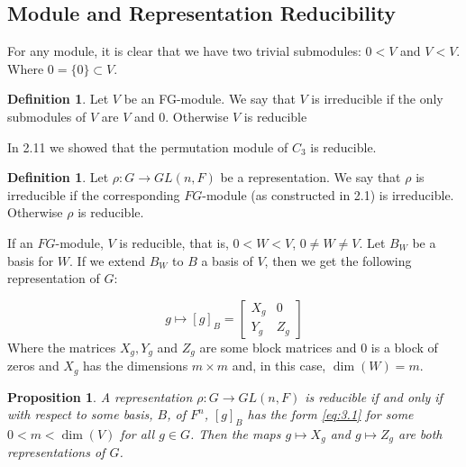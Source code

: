 \documentclass[11pt, notitlepage]{article}
\numberwithin{equation}{section}
\theoremstyle{plain}
\newtheorem{proposition}[theorem]{Proposition}
\theoremstyle{definition}
\newtheorem{definition}[theorem]{Definition}
\begin{document}
\subsection{Module and Representation Reducibility}

For any module, it is clear that we have two trivial submodules: $0<V$ and $V<V$. Where $0 = \{0\}\subset V$.

\begin{definition}
	Let $V$ be an FG-module. We say that $V$ is irreducible if the only submodules of $V$ are $V$ and $0$. Otherwise $V$ is reducible
\end{definition}

In 2.11 we showed that the permutation module of $C_3$ is reducible.

\begin{definition}
	Let $\rho:G\rightarrow GL(n,F)$ be a representation. We say that $\rho$ is irreducible if the corresponding $FG$-module (as constructed in 2.1) is irreducible. Otherwise $\rho$ is reducible.
\end{definition}

If an $FG$-module, $V$  is reducible, that is, $0<W<V$, $0\neq W\neq V$. Let $B_W$ be a basis for $W$. If we extend $B_W$ to $B$ a basis of $V$, then we get the following representation of $G$:

\begin{equation}\label{eq:3.1}
	g\mapsto [g]_B = \begin{bmatrix}
		X_g & 0\\Y_g & Z_g
	\end{bmatrix}
\end{equation}
Where the matrices $X_g,Y_g$ and $Z_g$ are some block matrices and $0$ is a block of zeros and $X_g$ has the dimensions $m\times m$ and, in this case, $\operatorname{dim}(W)=m$.
	
\begin{proposition}
	A representation $\rho:G\rightarrow GL(n,F)$ is reducible if and only if with respect to some basis, $B$, of $F^n$, $[g]_B$ has the form \ref{eq:3.1} for some $0<m<\operatorname{dim}(V)$ for all $g\in G$. Then the maps $g\mapsto X_g$ and $g\mapsto Z_g$ are both representations of $G$.
\end{proposition}
\end{document}
